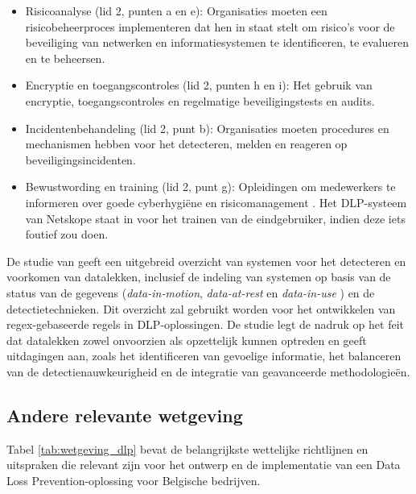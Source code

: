 \begin{itemize}
    \item Risicoanalyse (lid 2, punten a en e): Organisaties moeten een risicobeheerproces implementeren dat hen in staat stelt om risico's voor de beveiliging van netwerken en informatiesystemen te identificeren, te evalueren en te beheersen.
    \item Encryptie en toegangscontroles (lid 2, punten h en i): Het gebruik van encryptie, toegangscontroles en regelmatige beveiligingstests en audits.
    \item Incidentenbehandeling (lid 2, punt b): Organisaties moeten procedures en mechanismen hebben voor het detecteren, melden en reageren op beveiligingsincidenten.
    \item Bewustwording en training (lid 2, punt g): Opleidingen om medewerkers te informeren over goede cyberhygiëne en risicomanagement \autocite{nis2directive}. Het DLP-systeem van Netskope staat in voor het trainen van de eindgebruiker, indien deze iets foutief zou doen.
\end{itemize}

De studie van \textcite{Nayak2020} geeft een uitgebreid overzicht van systemen voor het detecteren en voorkomen van datalekken, 
inclusief de indeling van systemen op basis van de status van de gegevens (\textit{data-in-motion}, \textit{data-at-rest} en \textit{data-in-use} ) en de detectietechnieken. 
Dit overzicht zal gebruikt worden voor het ontwikkelen van regex-gebaseerde regels in DLP-oploss\-ingen. 
De studie legt de nadruk op het feit dat datalekken zowel onvoorzien als opzettelijk kunnen optreden en geeft uitdagingen aan, 
zoals het identificeren van gevoelige informatie, het balanceren van de detectienauwkeurigheid en de integratie van geavanceerde methodologieën.


\subsection{Andere relevante wetgeving}%

Tabel \ref{tab:wetgeving_dlp} bevat de belangrijkste wettelijke richtlijnen en uitspraken die relevant zijn voor het ontwerp en de implementatie van een Data Loss Prevention-oplossing voor Belgische bedrijven.


